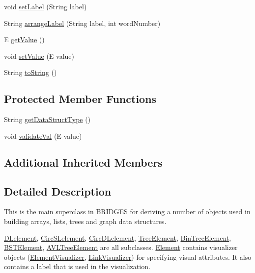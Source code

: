 \begin{DoxyCompactItemize}
\item 
void \hyperlink{classbridges_1_1base_1_1_element_a942ccd766aeca0c4fdbe27ef8cbe78d9}{set\+Label} (String label)
\item 
String \hyperlink{classbridges_1_1base_1_1_element_acd2191242df8a7bf2e8b6ced87880ba6}{arrange\+Label} (String label, int word\+Number)
\item 
E \hyperlink{classbridges_1_1base_1_1_element_a44ddc61db34b6cf0bab7dfba667d54af}{get\+Value} ()
\item 
void \hyperlink{classbridges_1_1base_1_1_element_ab3cf1241da0bc4c59cea9d6f0fd7aaf4}{set\+Value} (E value)
\item 
String \hyperlink{classbridges_1_1base_1_1_element_a7dc685e317fd9dc2e73e049a9f907e42}{to\+String} ()
\end{DoxyCompactItemize}
\subsection*{Protected Member Functions}
\begin{DoxyCompactItemize}
\item 
String \hyperlink{classbridges_1_1base_1_1_element_a6a1b70fa4b1936d10c6deb433acf8cd9}{get\+Data\+Struct\+Type} ()
\item 
void \hyperlink{classbridges_1_1base_1_1_element_af1a60f4e6a91d379179f7d56e6dc3829}{validate\+Val} (E value)
\end{DoxyCompactItemize}
\subsection*{Additional Inherited Members}


\subsection{Detailed Description}
This is the main superclass in B\+R\+I\+D\+G\+E\+S for deriving a number of objects used in building arrays, lists, trees and graph data structures. 

\hyperlink{classbridges_1_1base_1_1_d_lelement}{D\+Lelement}, \hyperlink{classbridges_1_1base_1_1_circ_s_lelement}{Circ\+S\+Lelement}, \hyperlink{classbridges_1_1base_1_1_circ_d_lelement}{Circ\+D\+Lelement}, \hyperlink{classbridges_1_1base_1_1_tree_element}{Tree\+Element}, \hyperlink{classbridges_1_1base_1_1_bin_tree_element}{Bin\+Tree\+Element}, \hyperlink{classbridges_1_1base_1_1_b_s_t_element}{B\+S\+T\+Element}, \hyperlink{classbridges_1_1base_1_1_a_v_l_tree_element}{A\+V\+L\+Tree\+Element} are all subclasses. \hyperlink{classbridges_1_1base_1_1_element}{Element} contains visualizer objects (\hyperlink{classbridges_1_1base_1_1_element_visualizer}{Element\+Visualizer}, \hyperlink{classbridges_1_1base_1_1_link_visualizer}{Link\+Visualizer}) for specifying visual attributes. It also contains a label that is used in the visualization.

